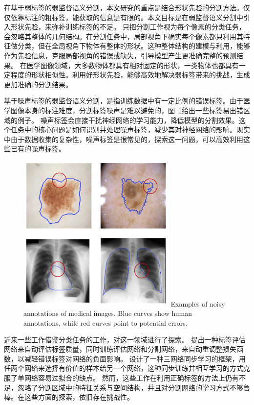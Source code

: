 在基于弱标签的弱监督语义分割，本文研究的重点是结合形状先验的分割方法。仅仅依靠标注的粗标签，能获取的信息是有限的。本文目标是在弱监督语义分割中引入形状先验，来弥补训练标签的不足。
只把分割工作视为每个像素的分类任务，会忽略其整体的几何结构。在分割任务中，局部视角下确实每个像素都只利用其特征做分类，但在全局视角下物体有整体的形状。这种整体结构的建模与利用，能够作为先验信息，克服局部视角的错误或缺失，引导模型产生更准确完整的预测结果。
在医学图像领域，大多数物体都具有相对固定的形状，一类物体也都具有一定程度的形状相似性。利用好形状先验，能够高效地解决弱标签带来的挑战，生成更加准确的分割结果。



基于噪声标签的弱监督语义分割，是指训练数据中有一定比例的错误标签。由于医学图像本身的标注难度，分割标签噪声是难以避免的，图~\ref{c1_fig3}给出一些标签易出错区域的例子。
噪声标签会直接干扰神经网络的学习能力，降低模型的分割效果。这个任务中的核心问题是如何识别并处理噪声标签，减少其对神经网络的影响。现实中由于数据收集的复杂性，噪声标签是很常见的，探索这一问题，可以高效利用这些已有的噪声标签。
    \begin{figure}[tbp]
        \centering 
        \includegraphics[width=0.7\textwidth]{img/c1/intro_3.png}
        {Examples of noisy annotations of medical images. Blue curves show human annotations, while red curves point to potential errors.}
        \label{c1_fig3}
    \end{figure}

近来一些工作借鉴分类任务的工作，对这一领域进行了探索。
\citet{Zhu2019PickandLearnAQ} 提出一种标签评估网络来自动评估标签质量，同时训练评估网络和分割网络，来自动重调整损失函数，以减轻错误标签对网络的负面影响。
\citet{Zhang2020RobustMI} 设计了一种三网络同步学习的框架，用任两个网络来选择有价值的样本给另一个网络，这种同步训练并相互学习的方式克服了单网络容易过拟合的缺点。
然而，这些工作在利用正确标签的方法上仍有不足，忽略了分割区域中的特征关系与空间结构，并且对分割网络的学习方式不够鲁棒。在这些方面的探索，依旧存在挑战性。

